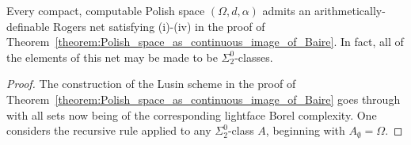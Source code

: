 \begin{proposition}
    \label{proposition:effective_net_over_Polish}
    Every compact, computable Polish space $(\Omega, d, \alpha)$ admits an arithmetically-definable Rogers net satisfying (i)-(iv) in the proof of Theorem~\ref{theorem:Polish_space_as_continuous_image_of_Baire}. In fact, all of the elements of this net may be made to be $\Sigma^0_2$-classes. 
\end{proposition}
\begin{proof}
    The construction of the Lusin scheme in the proof of Theorem~\ref{theorem:Polish_space_as_continuous_image_of_Baire} goes through with all sets now being of the corresponding lightface Borel complexity. One considers the recursive rule applied to any $\Sigma^0_2$-class $A$, beginning with $A_\emptyset = \Omega$.

    
    
    
    

\end{proof}
